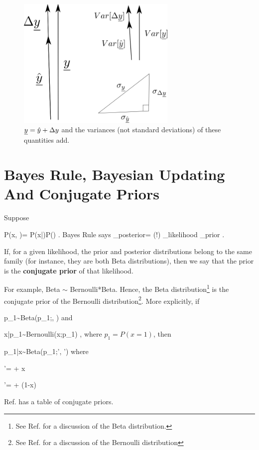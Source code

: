 \begin{figure}[h!]
\centering
\includegraphics[width=3in]
{conventions/ms-error.png}
\caption{${\underline{y}}=\hat{y}+\Delta y$
and the variances (not standard deviations) 
of these quantities add. } 
\label{fig-ms-error}
\end{figure}
\section{Bayes Rule,
Bayesian Updating And Conjugate Priors}

Suppose

\beq
P(x, \theta)= P(x|\theta)P(\theta)
\;.
\eeq
Bayes Rule says
\beq
{}_{\rm posterior}=
\caln(!\theta)
_{\rm likelihood}
_{\rm prior}
\;.
\eeq

If, for a given likelihood,
the prior and posterior
distributions belong to 
the same family (for instance, 
they are both 
Beta distributions),
then we say that the prior is the
{\bf conjugate prior}
of that likelihood.

For example, 
Beta $\sim$ Bernoulli*Beta.
Hence, the 
Beta distribution\footnote{See
Ref.\cite{wiki-beta-dist} for a discussion
of the Beta distribution.}
is the conjugate prior of the
Bernoulli distribution\footnote{See
Ref.\cite{wiki-bern-dist} for a discussion 
of the Bernoulli distribution}.
More explicitly,
if 

\beq
p_1\sim {\rm Beta}(p_1;\alp, \beta)
\eeq
and

\beq
x|p_1\sim {\rm Bernoulli}(x;p_1)
\;,
\eeq
where $p_1=P(x=1)$,
then

\beq
p_1|x\sim {\rm Beta}(p_1;\alp', \beta')
\eeq
where 

\beq
\alp'= \alp + x
\eeq

\beq
\beta'= \beta + (1-x)
\eeq


Ref.\cite{wiki-conj-prior}
has a table of
conjugate priors.

